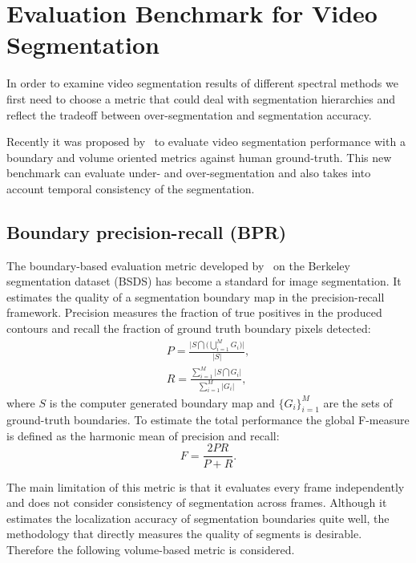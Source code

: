 \section{Evaluation Benchmark for Video Segmentation}
\label{ch4:bench}
In order to examine video segmentation results of different spectral methods we first need to choose a metric that could deal with segmentation hierarchies and reflect the tradeoff between over-segmentation and segmentation accuracy.

Recently it was proposed by~\cite{Galasso13} to evaluate video segmentation performance with a boundary and volume oriented metrics against human ground-truth.  
This new benchmark can evaluate under- and over-segmentation and also takes into account temporal consistency of the segmentation. 
\subsection{Boundary precision-recall (BPR)}
The boundary-based evaluation metric developed by~\cite{Martin01,Arbelaez11} on the Berkeley segmentation dataset (BSDS) has become a standard for image segmentation. It estimates the quality of a segmentation boundary map
in the precision-recall framework. Precision measures the fraction of true positives in the produced contours and recall the fraction of ground truth boundary pixels detected:
\begin{equation*}
\begin{aligned}
 P=\frac{ \lvert S\bigcap \bigr ( \bigcup_{i=1}^M G_i \bigl ) \rvert}{\rvert S \lvert},\\
 R =\frac{ \sum_{i=1}^M \lvert S\bigcap G_i \rvert}{\sum_{i=1}^M\rvert G_i \lvert},
\end{aligned}
\end{equation*}
where $S$ is the computer generated boundary map and $\{ G_i\}_{i=1}^M$ are the sets of ground-truth boundaries.
To estimate the total performance the global F-measure is defined as the harmonic mean of precision and recall:
\begin{equation*}
 F = \frac{2PR}{P+R}.
\end{equation*}

The main limitation of this metric is that it evaluates every frame independently and does not consider consistency of segmentation across frames. Although it estimates the localization accuracy of segmentation boundaries quite well,
the methodology that directly measures the quality of segments is desirable. Therefore the following volume-based metric is considered.
